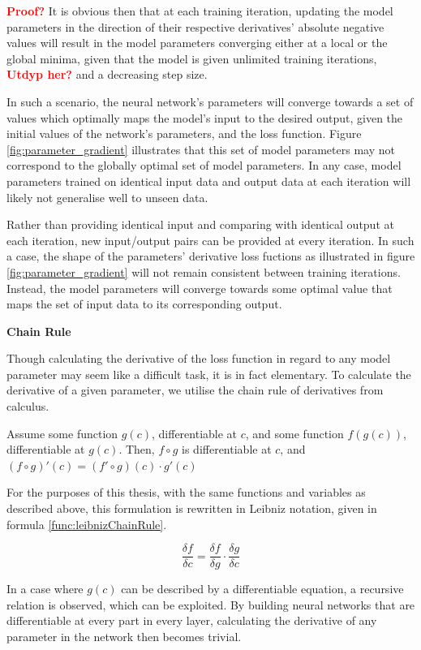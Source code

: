 \textcolor{red}{\textbf{Proof?}} It is obvious then that at each training iteration, 
updating the model parameters in the direction of their respective derivatives' absolute negative values
will result in the model parameters converging either at a local or the global minima,
given that the model is given unlimited training iterations, \textcolor{red}{\textbf{Utdyp her?}} and a decreasing step size.

In such a scenario, the neural network's parameters will converge towards a set of values which optimally maps the model's input to the desired output,
given the initial values of the network's parameters, and the loss function. Figure \ref{fig:parameter_gradient} illustrates that this set of model parameters
may not correspond to the globally optimal set of model parameters. In any case, model parameters trained on identical input data and output data at each iteration
will likely not generalise well to unseen data.

Rather than providing identical input and comparing with identical output at each iteration, new input/output pairs can be provided at every iteration. 
In such a case, the shape of the parameters' derivative loss fuctions as illustrated in figure \ref{fig:parameter_gradient} 
will not remain consistent between training iterations. Instead, the model parameters will converge towards some optimal value
that maps the set of input data to its corresponding output.

\textbf{Chain Rule}

Though calculating the derivative of the loss function in regard to any model parameter may seem like a difficult task, it is in fact elementary.
To calculate the derivative of a given parameter, we utilise the chain rule of derivatives from calculus.

Assume some function $ g(c) $, differentiable at $ c $, and some function $ f(g(c)) $, differentiable at $ g(c) $. 
Then, $ f \circ g $ is differentiable at $ c $, and $ (f \circ g)'(c) = (f' \circ g)(c) \cdot g'(c)  $ \cite{chainRule} 

For the purposes of this thesis, with the same functions and variables as described above, this formulation is rewritten in Leibniz notation, given in formula \ref{func:leibnizChainRule}.

\[
    \frac{\delta f}{\delta c} = \frac{\delta f}{\delta g} \cdot \frac{\delta g}{\delta c} \tag{2.8} \label{func:leibnizChainRule}
\]

In a case where $ g(c) $ can be described by a differentiable equation, a recursive relation is observed, which can be exploited. 
By building neural networks that are differentiable at every part in every layer, calculating the derivative of any parameter in the network then becomes trivial.

